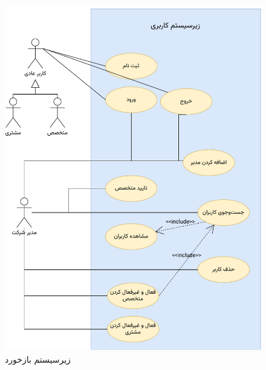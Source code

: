 \begin{figure}
\centering
	\includegraphics[scale=0.9, page=3]{figs/usecase.pdf}
\caption{زیرسیستم بازخورد}
\end{figure}
\FloatBarrier
\newpage

